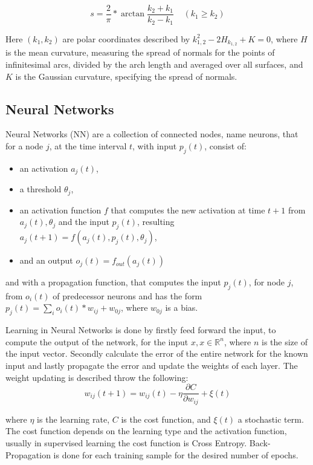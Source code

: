 \documentclass[12pt]{article}
\theoremstyle{definition}
\begin{document}
	\begin{equation*}
	s=\frac{2}{\pi}*\arctan{\frac{k_2+k_1}{k_2-k_1}} \;\;\;\;  (k_1 \geq k_2)
	\end{equation*}

	Here $(k_1, k_2)$ are polar coordinates described by $k_{1,2}^2-2H_{k_{1,2}}+K=0$, where $H$ is the mean curvature, measuring the spread of normals for the points of infinitesimal arcs, divided by the arch length and averaged over all surfaces, and $K$ is the Gaussian curvature, specifying the spread of normals.

	\subsection{Neural Networks}

	Neural Networks (NN) are a collection of connected nodes, name neurons, that for a node $j$, at the time interval $t$, with input  $p_j(t)$, consist of:
	\begin{itemize}
		\item an activation $a_j(t)$,
		\item a threshold $\theta_j$,
		\item an activation function $f$ that computes the new activation at time $t+1$ from $a_j(t), \theta_j$ and the input $p_j(t)$, resulting $a_j(t+1)=f(a_j(t), p_j(t), \theta_j)$,
		\item and an output $o_j(t)=f_{out}(a_j(t))$
	\end{itemize}
	and with a propagation function, that computes the input $p_j(t)$, for node $j$, from $o_i(t)$ of predecessor neurons and has the form $p_j(t)=\sum_io_i(t)*w_{ij} + w_{0j}$, where $w_{0j}$ is a bias.

	Learning in Neural Networks is done by firstly feed forward the input, to compute the output of the network, for the input $x, x \in \mathbb{R}^n$, where $n$ is the size of the input vector. Secondly calculate the error of the entire network for the known input and lastly propagate the error and update the weights of each layer. The weight updating is described throw the following:
	\begin{equation*}
		w_{ij}(t+1)=w_{ij}(t)-\eta\frac{\partial C}{\partial w_{ij}}+ \xi(t)
	\end{equation*}

	where $\eta$ is the learning rate, $C$ is the cost function, and $\xi(t)$ a stochastic term. The cost function depends on the learning type and the activation function, usually in supervised learning the cost function is Cross Entropy. Back-Propagation is done for each training sample for the desired number of epochs.
\end{document}
